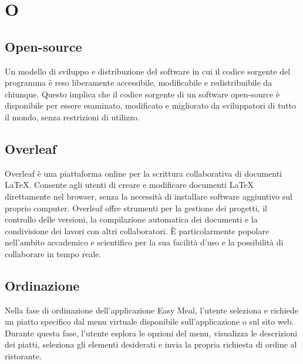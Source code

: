 \section{O} 
\subsection{Open-source} 
Un modello di sviluppo e distribuzione del software in cui il codice sorgente del programma è reso liberamente accessibile, modificabile e redistribuibile da chiunque. Questo implica che il codice sorgente di un software open-source è disponibile per essere esaminato, modificato e migliorato da sviluppatori di tutto il mondo, senza restrizioni di utilizzo.
\subsection{Overleaf} 
Overleaf è una piattaforma online per la scrittura collaborativa di documenti LaTeX. Consente agli utenti di creare e modificare documenti LaTeX direttamente nel browser, senza la necessità di installare software aggiuntivo sul proprio computer. Overleaf offre strumenti per la gestione dei progetti, il controllo delle versioni, la compilazione automatica dei documenti e la condivisione dei lavori con altri collaboratori. È particolarmente popolare nell'ambito accademico e scientifico per la sua facilità d'uso e la possibilità di collaborare in tempo reale. 
\subsection{Ordinazione} 
Nella fase di ordinazione dell'applicazione Easy Meal, l'utente seleziona e richiede un piatto specifico dal menu virtuale disponibile sull'applicazione o sul sito web. Durante questa fase, l'utente esplora le opzioni del menu, visualizza le descrizioni dei piatti, seleziona gli elementi desiderati e invia la propria richiesta di ordine al ristorante. 
